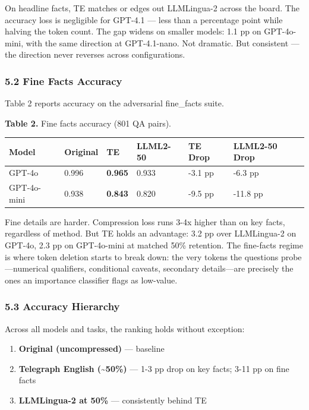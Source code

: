 \documentclass[
]{article}
\newcounter{none} %
\providecommand{\tightlist}{%
  \setlength{\itemsep}{0pt}\setlength{\parskip}{0pt}}
\begin{document}
On headline facts, TE matches or edges out LLMLingua-2 across the board.
The accuracy loss is negligible for GPT-4.1 --- less than a percentage
point while halving the token count. The gap widens on smaller models:
1.1 pp on GPT-4o-mini, with the same direction at GPT-4.1-nano. Not
dramatic. But consistent --- the direction never reverses across
configurations.

\subsubsection{5.2 Fine Facts Accuracy}\label{fine-facts-accuracy}

Table 2 reports accuracy on the adversarial fine\_facts suite.

\textbf{Table 2.} Fine facts accuracy (801 QA pairs).

{\def\LTcaptype{none} %
\begin{longtable}[]{@{}llllll@{}}
\toprule\noalign{}
Model & Original & TE & LLML2-50 & TE Drop & LLML2-50 Drop \\
\midrule\noalign{}
\endhead
\bottomrule\noalign{}
\endlastfoot
GPT-4o & 0.996 & \textbf{0.965} & 0.933 & -3.1 pp & -6.3 pp \\
GPT-4o-mini & 0.938 & \textbf{0.843} & 0.820 & -9.5 pp & -11.8 pp \\
\end{longtable}
}

Fine details are harder. Compression loss runs 3-4x higher than on key
facts, regardless of method. But TE holds an advantage: 3.2 pp over
LLMLingua-2 on GPT-4o, 2.3 pp on GPT-4o-mini at matched 50\% retention.
The fine-facts regime is where token deletion starts to break down: the
very tokens the questions probe---numerical qualifiers, conditional
caveats, secondary details---are precisely the ones an importance
classifier flags as low-value.

\subsubsection{5.3 Accuracy Hierarchy}\label{accuracy-hierarchy}

Across all models and tasks, the ranking holds without exception:

\begin{enumerate}
\def\labelenumi{\arabic{enumi}.}
\tightlist
\item
  \textbf{Original (uncompressed)} --- baseline
\item
  \textbf{Telegraph English (\textasciitilde50\%)} --- 1-3 pp drop on
  key facts; 3-11 pp on fine facts
\item
  \textbf{LLMLingua-2 at 50\%} --- consistently behind TE
\end{enumerate}
\end{document}
